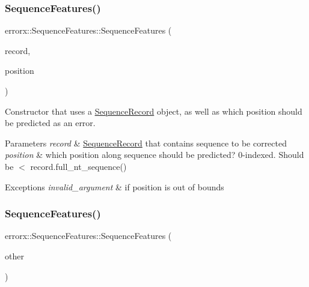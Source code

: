 \subsubsection{\texorpdfstring{Sequence\+Features()}{SequenceFeatures()}\hspace{0.1cm}{\footnotesize\ttfamily [1/2]}}
{\footnotesize\ttfamily errorx\+::\+Sequence\+Features\+::\+Sequence\+Features (\begin{DoxyParamCaption}\item[{\mbox{\hyperlink{classerrorx_1_1_sequence_record}{Sequence\+Record}} $\ast$const}]{record,  }\item[{int}]{position }\end{DoxyParamCaption})}

Constructor that uses a \mbox{\hyperlink{classerrorx_1_1_sequence_record}{Sequence\+Record}} object, as well as which position should be predicted as an error.


\begin{DoxyParams}{Parameters}
{\em record} & \mbox{\hyperlink{classerrorx_1_1_sequence_record}{Sequence\+Record}} that contains sequence to be corrected \\
\hline
{\em position} & which position along sequence should be predicted? 0-\/indexed. Should be $<$ record.\+full\+\_\+nt\+\_\+sequence()\\
\hline
\end{DoxyParams}

\begin{DoxyExceptions}{Exceptions}
{\em invalid\+\_\+argument} & if position is out of bounds \\
\hline
\end{DoxyExceptions}
\mbox{\label{classerrorx_1_1_sequence_features_a56d12eebfb084dc6cb0ce45faf3148ef}} 
\subsubsection{\texorpdfstring{Sequence\+Features()}{SequenceFeatures()}\hspace{0.1cm}{\footnotesize\ttfamily [2/2]}}
{\footnotesize\ttfamily errorx\+::\+Sequence\+Features\+::\+Sequence\+Features (\begin{DoxyParamCaption}\item[{\mbox{\hyperlink{classerrorx_1_1_sequence_features}{Sequence\+Features}} const \&}]{other }\end{DoxyParamCaption})}

